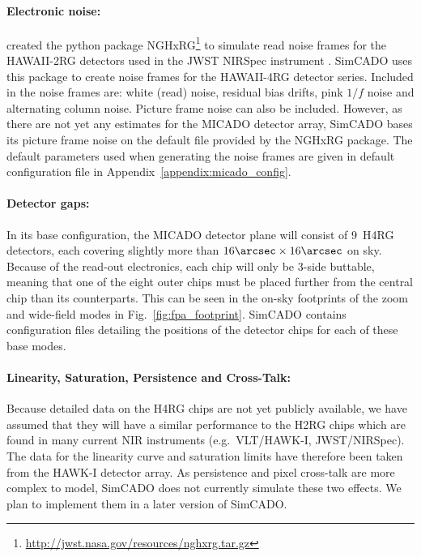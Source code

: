 \paragraph{Electronic noise:} \citet{nghxrg} created the python package NGHxRG\footnote{\url{http://jwst.nasa.gov/resources/nghxrg.tar.gz}} to simulate read noise frames for the HAWAII-2RG detectors used in the JWST NIRSpec instrument \citep{nirspec}. SimCADO uses this package to create noise frames for the HAWAII-4RG detector series. Included in the noise frames are: white (read) noise, residual bias drifts, pink $1/f$ noise and alternating column noise. Picture frame noise can also be included. However, as there are not yet any estimates for the MICADO detector array, SimCADO bases its picture frame noise on the default file provided by the NGHxRG package. The default parameters used when generating the noise frames are given in default configuration file in Appendix~\ref{appendix:micado_config}.


\paragraph{Detector gaps:} In its base configuration, the MICADO detector plane will consist of 9~H4RG detectors, each covering slightly more than $16\arcsec\times 16\arcsec$ on sky. Because of the read-out electronics, each chip will only be 3-side buttable, meaning that one of the eight outer chips must be placed further from the central chip than its counterparts. This can be seen in the on-sky footprints of the zoom and wide-field modes in Fig.~\ref{fig:fpa_footprint}. SimCADO contains configuration files detailing the positions of the detector chips for each of these base modes. 

\paragraph{Linearity, Saturation, Persistence and Cross-Talk:} Because detailed data on the H4RG chips are not yet publicly available, we have assumed that they will have a similar performance to the H2RG chips which are found in many current NIR instruments (e.g.~VLT/HAWK-I, JWST/NIRSpec). The data for the linearity curve and saturation limits have therefore been taken from the HAWK-I detector array. As persistence and pixel cross-talk are more complex to model, SimCADO does not currently simulate these two effects. We plan to implement them in a later version of SimCADO.

